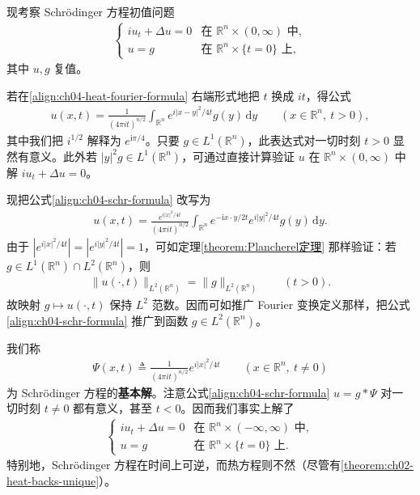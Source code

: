 \documentclass[../../main.tex]{subfiles}
\begin{document}
\begin{example}\label{example:ch04-schrodinger}现考察 Schrödinger 方程初值问题
\begin{align}\label{align:ch04-schr-ivp}
\begin{cases}
iu_t+\Delta u=0 & \text{在 }\mathbb{R}^n\times(0,\infty)\text{ 中},\\
u=g & \text{在 }\mathbb{R}^n\times\{t=0\}\text{ 上},
\end{cases}
\end{align}
其中 $u,g$ 复值。

若在\eqref{align:ch04-heat-fourier-formula} 右端形式地把 $t$ 换成 $it$，得公式
\begin{align}\label{align:ch04-schr-formula}
u(x,t)=\frac{1}{(4\pi it)^{n/2}}\int_{\mathbb{R}^n}e^{i|x-y|^2/4t}g(y)\,\mathrm{d}y \qquad(x\in\mathbb{R}^n,\ t>0),
\end{align}
其中我们把 $i^{1/2}$ 解释为 $e^{\mathrm{i}\pi/4}$。只要 $g\in L^1(\mathbb{R}^n)$，此表达式对一切时刻 $t>0$ 显然有意义。此外若 $|y|^2g\in L^1(\mathbb{R}^n)$，可通过直接计算验证 $u$ 在 $\mathbb{R}^n\times(0,\infty)$ 中解 $iu_t+\Delta u=0$。

现把公式\eqref{align:ch04-schr-formula} 改写为
\begin{align*}
u(x,t)=\frac{e^{i|x|^2/4t}}{(4\pi it)^{n/2}}\int_{\mathbb{R}^n}e^{-\mathrm{i}x\cdot y/2t}e^{i|y|^2/4t}g(y)\,\mathrm{d}y.
\end{align*}
由于 $|e^{i|x|^2/4t}|=|e^{i|y|^2/4t}|=1$，可如定理\cref{theorem:Plancherel定理} 那样验证：若 $g\in L^1(\mathbb{R}^n)\cap L^2(\mathbb{R}^n)$，则
\begin{align}\label{align:ch04-schr-cons}
\|u(\cdot,t)\|_{L^2(\mathbb{R}^n)}=\|g\|_{L^2(\mathbb{R}^n)} \qquad(t>0).
\end{align}
故映射 $g\mapsto u(\cdot,t)$ 保持 $L^2$ 范数。因而可如推广 Fourier 变换定义那样，把公式\eqref{align:ch04-schr-formula} 推广到函数 $g\in L^2(\mathbb{R}^n)$。

我们称
\begin{align}\label{align:ch04-schr-kernel}
\Psi(x,t)\triangleq\frac{1}{(4\pi it)^{n/2}}e^{i|x|^2/4t} \qquad(x\in\mathbb{R}^n,\ t\neq 0)
\end{align}
为 Schrödinger 方程的\textbf{基本解}。注意公式\eqref{align:ch04-schr-formula} $u=g*\Psi$ 对一切时刻 $t\neq 0$ 都有意义，甚至 $t<0$。因而我们事实上解了
\begin{align*}
\begin{cases}
iu_t+\Delta u=0 & \text{在 }\mathbb{R}^n\times(-\infty,\infty)\text{ 中},\\
u=g & \text{在 }\mathbb{R}^n\times\{t=0\}\text{ 上}.
\end{cases}
\end{align*}
特别地，Schrödinger 方程在时间上可逆，而热方程则不然（尽管有\cref{theorem:ch02-heat-backs-unique}）。
\end{example}
\end{document}
